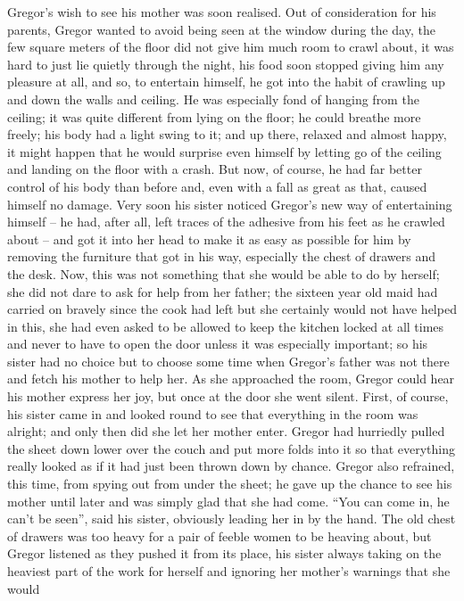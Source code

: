 Gregor’s wish to see his mother was soon realised. Out of consideration
for his parents, Gregor wanted to avoid being seen at the window during
the day, the few square meters of the floor did not give him much room
to crawl about, it was hard to just lie quietly through the night, his
food soon stopped giving him any pleasure at all, and so, to entertain
himself, he got into the habit of crawling up and down the walls and
ceiling. He was especially fond of hanging from the ceiling; it was
quite different from lying on the floor; he could breathe more freely;
his body had a light swing to it; and up there, relaxed and almost
happy, it might happen that he would surprise even himself by letting
go of the ceiling and landing on the floor with a crash. But now, of
course, he had far better control of his body than before and, even
with a fall as great as that, caused himself no damage. Very soon his
sister noticed Gregor’s new way of entertaining himself – he had, after
all, left traces of the adhesive from his feet as he crawled about – and
got it into her head to make it as easy as possible for him by removing
the furniture that got in his way, especially the chest of drawers and
the desk. Now, this was not something that she would be able to do by
herself; she did not dare to ask for help from her father; the sixteen
year old maid had carried on bravely since the cook had left but she
certainly would not have helped in this, she had even asked to be
allowed to keep the kitchen locked at all times and never to have to
open the door unless it was especially important; so his sister had no
choice but to choose some time when Gregor’s father was not there and
fetch his mother to help her. As she approached the room, Gregor could
hear his mother express her joy, but once at the door she went silent.
First, of course, his sister came in and looked round to see that
everything in the room was alright; and only then did she let her
mother enter. Gregor had hurriedly pulled the sheet down lower over the
couch and put more folds into it so that everything really looked as if
it had just been thrown down by chance. Gregor also refrained, this
time, from spying out from under the sheet; he gave up the chance to
see his mother until later and was simply glad that she had come. “You
can come in, he can’t be seen”, said his sister, obviously leading her
in by the hand. The old chest of drawers was too heavy for a pair of
feeble women to be heaving about, but Gregor listened as they pushed it
from its place, his sister always taking on the heaviest part of the
work for herself and ignoring her mother’s warnings that she would
